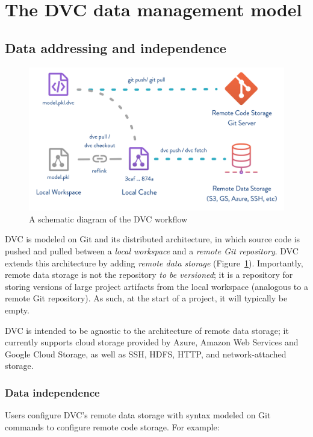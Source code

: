 \documentclass[10pt,sigconf, authordraft]{acmart}
\begin{document}
\section{The DVC data management model}
\subsection{Data addressing and independence}



\begin{figure}[h]
  \centering
  \includegraphics[width=\linewidth]{flow-large.png}
  \caption{A schematic diagram of the DVC workflow}
  \label{fig:fig1}
\end{figure}

DVC is modeled on Git and its distributed architecture, in which source code is pushed and pulled between a \textit{local workspace} and a \textit{remote Git repository}. DVC extends this architecture by adding \textit{remote data storage} (Figure~\ref{fig:fig1}). Importantly, remote data storage is not the repository \textit{to be versioned}; it is a repository for storing versions of large project artifacts from the local workspace (analogous to a remote Git repository). As such, at the start of a project, it will typically be empty. 

DVC is intended to be agnostic to the architecture of remote data storage; it currently supports cloud storage provided by Azure, Amazon Web Services and Google Cloud Storage, as well as SSH, HDFS, HTTP, and network-attached storage.  

\subsubsection{Data independence} Users configure DVC's remote data storage with syntax modeled on Git commands to configure remote code storage. For example:
\end{document}
